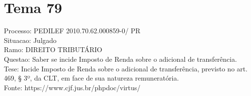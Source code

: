 \documentclass[12pt]{article}
\begin{document}
\section*{Tema 79}
Processo: PEDILEF 2010.70.62.000859-0/ PR\\
Situacao: Julgado\\
Ramo: DIREITO TRIBUTÁRIO\\
Questao: Saber se incide Imposto de Renda sobre o adicional de transferência.\\
Tese: Incide Imposto de Renda sobre o adicional de transferência, previsto no art. 469, § 3º, da CLT, em face de sua natureza remuneratória.\\
Fonte: https://www.cjf.jus.br/phpdoc/virtus/
\end{document}
